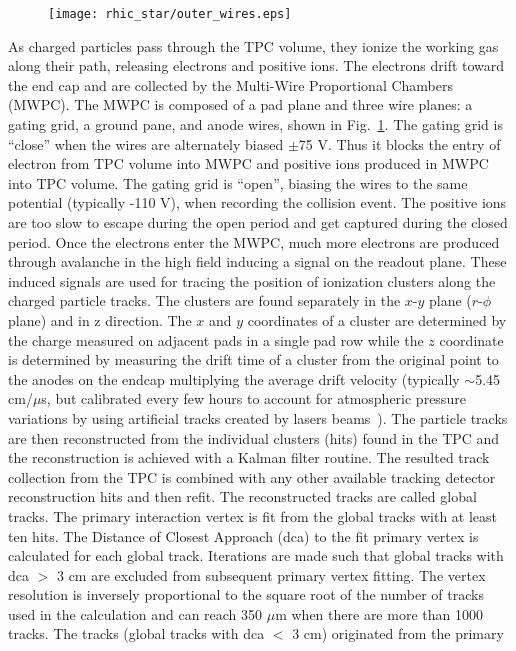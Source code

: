 \begin{figure}[htbp]
\centering
\texttt{[image: rhic\_star/outer\_wires.eps]}
 \label{mwpc}
\end{figure}

As charged particles pass through the TPC volume, they ionize the working gas along their path, releasing electrons and positive ions. The electrons drift toward the end cap and are collected by the Multi-Wire Proportional Chambers (MWPC). The MWPC is composed of a pad plane and three wire planes: a gating grid, a ground pane, and anode wires, shown in Fig.~\ref{mwpc}. The gating grid is ``close'' when the wires are alternately biased $\pm$75 V. Thus it blocks the entry of electron from TPC volume into MWPC and positive ions produced in MWPC into TPC volume. The gating grid is ``open'', biasing the wires to the same potential (typically -110 V), when recording the collision event. The positive ions are too slow to escape during the open period and get captured during the closed period. Once the electrons enter the MWPC, much more electrons are produced through avalanche in the high field inducing a signal on the readout plane. These induced signals  are used for tracing the position of ionization clusters along the charged particle tracks. The clusters are found separately in the $x$-$y$ plane ($r$-$\phi$ plane) and in z direction. The $x$ and $y$ coordinates of a cluster are determined by the charge measured on adjacent pads in a single pad row while the $z$ coordinate is determined by measuring the drift time of a cluster from the original point to the anodes on the endcap multiplying the average drift velocity (typically $\sim$5.45 cm/$\mu$s, but calibrated every few hours to account for atmospheric pressure variations by using artificial tracks created by lasers beams~\cite{TPClaser}). The particle tracks are then reconstructed from the individual clusters (hits) found in the TPC and the reconstruction is achieved with a Kalman filter routine. The resulted track collection from the TPC is combined with any other available tracking detector reconstruction hits and then refit. The reconstructed tracks are called global tracks. The primary interaction vertex is fit from the global tracks with at least ten hits. The Distance of Closest Approach (dca) to the fit primary vertex is calculated for each global track. Iterations are made such that global tracks with dca $>$ 3 cm are excluded from subsequent primary vertex fitting. The vertex resolution is inversely proportional to the square root of the number of tracks used in the calculation and can reach 350 $\mu$m when there are more than 1000 tracks. The tracks (global tracks with dca $<$ 3 cm) originated from the primary 
